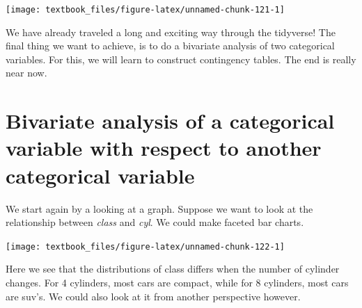 \documentclass[]{tufte-book}
\newenvironment{Shaded}{}{}
\newcommand{\KeywordTok}[1]{\textcolor[rgb]{0.00,0.44,0.13}{\textbf{#1}}}
\newcommand{\NormalTok}[1]{#1}
\newcommand{\OperatorTok}[1]{\textcolor[rgb]{0.40,0.40,0.40}{#1}}
\newcommand{\StringTok}[1]{\textcolor[rgb]{0.25,0.44,0.63}{#1}}
\begin{document}
\texttt{[image: textbook\_files/figure-latex/unnamed-chunk-121-1]}

We have already traveled a long and exciting way through the tidyverse! The final thing we want to achieve, is to do a bivariate analysis of two categorical variables. For this, we will learn to construct contingency tables. The end is really near now.

\hypertarget{bivariate-analysis-of-a-categorical-variable-with-respect-to-another-categorical-variable}{%
\section{Bivariate analysis of a categorical variable with respect to another categorical variable}\label{bivariate-analysis-of-a-categorical-variable-with-respect-to-another-categorical-variable}}

We start again by a looking at a graph. Suppose we want to look at the relationship between \emph{class} and \emph{cyl}. We could make faceted bar charts.

\begin{Shaded}
\end{Shaded}

\texttt{[image: textbook\_files/figure-latex/unnamed-chunk-122-1]}

Here we see that the distributions of class differs when the number of cylinder changes. For 4 cylinders, most cars are compact, while for 8 cylinders, most cars are suv's. We could also look at it from another perspective however.

\begin{Shaded}
\end{Shaded}
\end{document}
